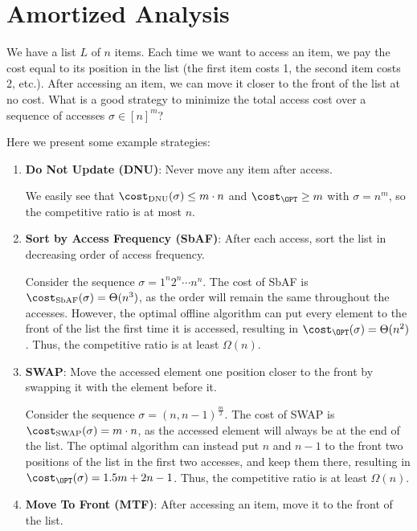 \section{Amortized Analysis}

\begin{problem}
We have a list $L$ of $n$ items. Each time we want to access an item, we pay the cost equal to its position in the list (the first item costs 1, the second item costs 2, etc.). After accessing an item, we can move it closer to the front of the list at no cost. What is a good strategy to minimize the total access cost over a sequence of accesses $\sigma \in [n]^m$?
\end{problem}

Here we present some example strategies:

\begin{enumerate}
	\item \textbf{Do Not Update (DNU)}: Never move any item after access.

	      We easily see that $\cost_{\text{DNU}}(\sigma) \leq m \cdot n$ and $\cost_{\OPT} \geq m$ with $\sigma = n^m$, so the competitive ratio is at most $n$.
	\item \textbf{Sort by Access Frequency (SbAF)}: After each access, sort the list in decreasing order of access frequency.

	      Consider the sequence $\sigma = 1^n 2^n \cdots n^n$. The cost of SbAF is $\cost_{\text{SbAF}}(\sigma) = \Theta(n^3)$, as the order will remain the same throughout the accesses. However, the optimal offline algorithm can put every element to the front of the list the first time it is accessed, resulting in $\cost_{\OPT}(\sigma) = \Theta(n^2)$. Thus, the competitive ratio is at least $\Omega(n)$.
	\item \textbf{SWAP}: Move the accessed element one position closer to the front by swapping it with the element before it.

	      Consider the sequence $\sigma = (n, n-1)^{\frac{m}{2}}$. The cost of SWAP is $\cost_{\text{SWAP}}(\sigma) = m\cdot n$, as the accessed element will always be at the end of the list. The optimal algorithm can instead put $n$ and $n-1$ to the front two positions of the list in the first two accesses, and keep them there, resulting in $\cost_{\OPT}(\sigma) = 1.5m+2n-1$. Thus, the competitive ratio is at least $\Omega(n)$.
	\item \textbf{Move To Front (MTF)}: After accessing an item, move it to the front of the list.

\end{enumerate}

